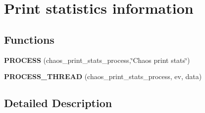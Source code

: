 \hypertarget{group__chaos-test-print-stats}{\section{Print statistics information}
\label{group__chaos-test-print-stats}
}
\subsection*{Functions}
\begin{DoxyCompactItemize}
\item 
\hypertarget{group__chaos-test-print-stats_gaba1b7c42a3ed004b9bd807614dad3d68}{{\bfseries P\-R\-O\-C\-E\-S\-S} (chaos\-\_\-print\-\_\-stats\-\_\-process,\char`\"{}Chaos print stats\char`\"{})}\label{group__chaos-test-print-stats_gaba1b7c42a3ed004b9bd807614dad3d68}

\item 
\hypertarget{group__chaos-test-print-stats_ga79876a428d31b2cdf14a94868f871aad}{{\bfseries P\-R\-O\-C\-E\-S\-S\-\_\-\-T\-H\-R\-E\-A\-D} (chaos\-\_\-print\-\_\-stats\-\_\-process, ev, data)}\label{group__chaos-test-print-stats_ga79876a428d31b2cdf14a94868f871aad}

\end{DoxyCompactItemize}


\subsection{Detailed Description}

